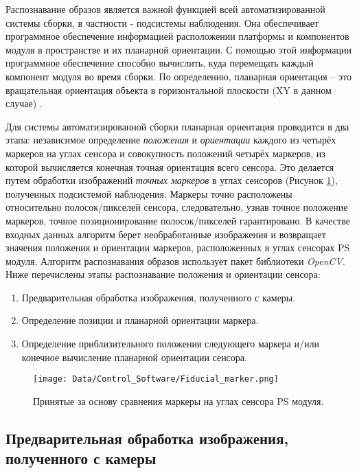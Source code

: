 Распознавание образов является важной функцией всей автоматизированной системы сборки, в частности - подсистемы наблюдения. Она обеспечивает программное обеспечение информацией расположении платформы и компонентов модуля в пространстве и их планарной ориентации. С помощью этой информации программное обеспечение способно вычислить, куда перемещать каждый компонент модуля во время сборки. По определению, планарная ориентация -- это вращательная ориентация объекта в горизонтальной плоскости (XY в данном случае) \cite{AutomatedAssembly_tutorial}.

Для системы автоматизированной сборки планарная ориентация проводится в два этапа: независимое определение \emph{положения} и \emph{ориентации} каждого из четырёх маркеров на углах сенсора и совокупность положений четырёх маркеров, из которой вычисляется конечная точная ориентация всего сенсора. Это делается путем обработки изображений \emph{точных маркеров} в углах сенсоров (Рисунок \ref{fig:fiducial_marker}), полученных подсистемой наблюдения. Маркеры точно расположены относительно полосок/пикселей сенсора, следовательно, узнав точное положение маркеров, точное позиционирование полосок/пикселей гарантировано. В качестве входных данных алгоритм берет необработанные изображения и возвращает значения положения и ориентации маркеров, расположенных в углах сенсорах PS модуля. Алгоритм распознавания образов использует пакет библиотеки \emph{OpenCV}. Ниже перечислены этапы распознавание положения и ориентации сенсора:

\begin{enumerate}
\setlength\itemsep{-0.5em}
\item Предварительная обработка изображения, полученного с камеры.
\item Определение позиции и планарной ориентации маркера.
\item Определение приблизительного положения следующего маркера и/или конечное вычисление планарной ориентации сенсора.
\end{enumerate}

\begin{figure}[ht]\centering
\texttt{[image: Data/Control\_Software/Fiducial\_marker.png]}
\caption{Принятые за основу сравнения маркеры на углах сенсора PS модуля.}
\label{fig:fiducial_marker}
\end{figure}

\subsection{Предварительная обработка изображения, полученного с камеры}

